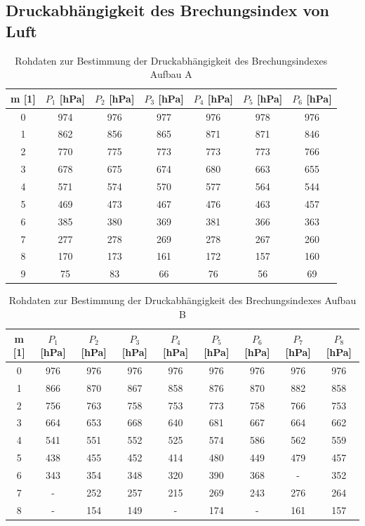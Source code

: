 \documentclass[12pt,a4paper]{article}
\begin{document}
\subsection{Druckabhängigkeit des Brechungsindex von Luft}

\begin{table}
\begin{center}
\begin{tabular}{|c|c|c|c|c|c|c|}
\hline 
m [1] & $P_1$ [hPa] & $P_2$ [hPa] & $P_3$ [hPa] & $P_4$ [hPa] & $P_5$ [hPa] & $P_6$ [hPa] \\ 
\hline 
0 & 974 & 976 & 977 & 976 & 978 & 976 \\ 
\hline 
1 & 862 & 856 & 865 & 871 & 871 & 846 \\ 
\hline 
2 & 770 & 775 & 773 & 773 & 773 & 766 \\ 
\hline 
3 & 678 & 675 & 674 & 680 & 663 & 655 \\ 
\hline 
4 & 571 & 574 & 570 & 577 & 564 & 544 \\ 
\hline 
5 & 469 & 473 & 467 & 476 & 463 & 457 \\ 
\hline 
6 & 385 & 380 & 369 & 381 & 366 & 363 \\ 
\hline 
7 & 277 & 278 & 269 & 278 & 267 & 260 \\ 
\hline 
8 & 170 & 173 & 161 & 172 & 157 & 160 \\ 
\hline 
9 & 75 & 83 & 66 & 76 & 56 & 69 \\ 
\hline 
\end{tabular} 
\caption{Rohdaten zur Bestimmung der Druckabhängigkeit des Brechungsindexes Aufbau A}
\label{tab:Rohdaten_Druck_A}
\end{center}
\end{table}

\begin{table}
\begin{center}
\begin{tabular}{|c|c|c|c|c|c|c|c|c|}
\hline 
m [1] & $P_1$ [hPa] & $P_2$ [hPa] & $P_3$ [hPa] & $P_4$ [hPa] & $P_5$ [hPa] & $P_6$ [hPa] & $P_7$ [hPa] & $P_8$ [hPa] \\ 
\hline 
0 & 976 & 976 & 976 & 976 & 976 & 976 & 976 & 976 \\ 
\hline 
1 & 866 & 870 & 867 & 858 & 876 & 870 & 882 & 858 \\ 
\hline 
2 & 756 & 763 & 758 & 753 & 773 & 758 & 766 & 753 \\ 
\hline 
3 & 664 & 653 & 668 & 640 & 681 & 667 & 664 & 662 \\ 
\hline 
4 & 541 & 551 & 552 & 525 & 574 & 586 & 562 & 559 \\ 
\hline 
5 & 438 & 455 & 452 & 414 & 480 & 449 & 479 & 457 \\ 
\hline 
6 & 343 & 354 & 348 & 320 & 390 & 368 & - & 352 \\ 
\hline 
7 & - & 252 & 257 & 215 & 269 & 243 & 276 & 264 \\ 
\hline 
8 & - & 154 & 149 & - & 174 & - & 161 & 157 \\ 
\hline 
\end{tabular} 
\caption{Rohdaten zur Bestimmung der Druckabhängigkeit des Brechungsindexes Aufbau B}
\label{tab:Rohdaten_Druck_B}
\end{center}
\end{table}
\end{document}
